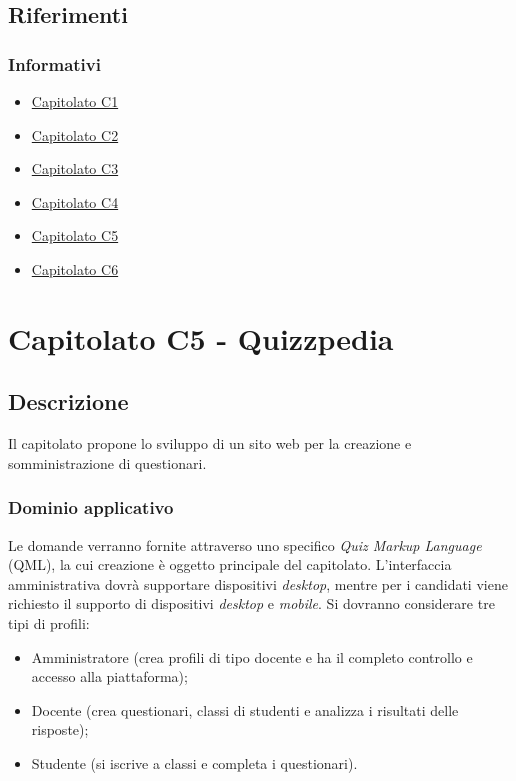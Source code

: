 \documentclass[12pt,a4paper]{article}
\begin{document}
\subsection{Riferimenti}
\subsubsection{Informativi}

\begin{itemize}
\item \href{http://www.math.unipd.it/~tullio/IS-1/2015/Progetto/C1.pdf}{Capitolato C1}
\item \href{http://www.math.unipd.it/~tullio/IS-1/2015/Progetto/C2.pdf}{Capitolato C2}
\item \href{http://www.math.unipd.it/~tullio/IS-1/2015/Progetto/C3.pdf}{Capitolato C3}
\item \href{http://www.math.unipd.it/~tullio/IS-1/2015/Progetto/C4.pdf}{Capitolato C4}
\item \href{http://www.math.unipd.it/~tullio/IS-1/2015/Progetto/C5.pdf}{Capitolato C5}
\item \href{http://www.math.unipd.it/~tullio/IS-1/2015/Progetto/C6.pdf}{Capitolato C6}
\end{itemize}


\newpage
\section{Capitolato C5 - Quizzpedia}
\subsection{Descrizione}

Il capitolato propone lo sviluppo di un sito web per la creazione e somministrazione di questionari.

\subsubsection{Dominio applicativo}

Le domande verranno fornite attraverso uno specifico \textit{Quiz Markup Language} (QML), la cui creazione è oggetto principale del capitolato. L'interfaccia amministrativa dovrà supportare dispositivi \textit{desktop}, mentre per i candidati viene richiesto il supporto di dispositivi \textit{desktop} e \textit{mobile}. Si dovranno considerare tre tipi di profili:

\begin{itemize}
\item Amministratore (crea profili di tipo docente e ha il completo controllo e accesso alla piattaforma);
\item Docente (crea questionari, classi di studenti e analizza i risultati delle risposte);
\item Studente (si iscrive a classi e completa i questionari).
\end{itemize}
\end{document}
